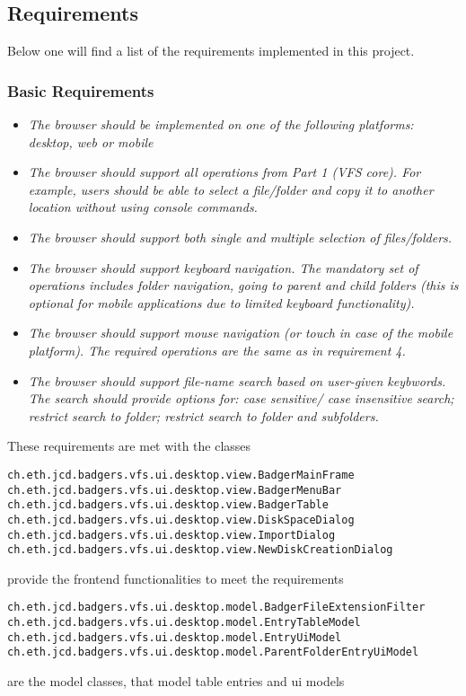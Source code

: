\subsection{Requirements}
Below one will find a list of the requirements implemented in this project.

\subsubsection {Basic Requirements}
\begin{itemize}
  \item \emph{The browser should be implemented on one of the following
  platforms: desktop, web or mobile}
  \item \emph{The browser should support all operations from Part 1 (VFS core).
  For example, users should be able to select a file/folder and copy it to
  another location without using console commands. }
  \item \emph{The browser should support both single and multiple selection of
  files/folders.}
  \item \emph{The browser should support keyboard navigation. The mandatory set of operations includes folder
  navigation, going to parent and child folders (this is optional for mobile applications due to limited
  keyboard functionality).}
  \item \emph{The browser should support mouse navigation (or touch in case of the mobile platform). The
  required operations are the same as in requirement 4.}
  \item \emph{The browser should support file-name search based on user-given
  keybwords. The search should provide options for: case sensitive/ case
  insensitive search; restrict search to folder; restrict search to folder and subfolders.}
\end{itemize}  These requirements are met with the classes
\begin{verbatim}
ch.eth.jcd.badgers.vfs.ui.desktop.view.BadgerMainFrame
ch.eth.jcd.badgers.vfs.ui.desktop.view.BadgerMenuBar
ch.eth.jcd.badgers.vfs.ui.desktop.view.BadgerTable
ch.eth.jcd.badgers.vfs.ui.desktop.view.DiskSpaceDialog
ch.eth.jcd.badgers.vfs.ui.desktop.view.ImportDialog
ch.eth.jcd.badgers.vfs.ui.desktop.view.NewDiskCreationDialog
\end{verbatim} provide the frontend functionalities to meet the requirements

\begin{verbatim}
ch.eth.jcd.badgers.vfs.ui.desktop.model.BadgerFileExtensionFilter
ch.eth.jcd.badgers.vfs.ui.desktop.model.EntryTableModel
ch.eth.jcd.badgers.vfs.ui.desktop.model.EntryUiModel
ch.eth.jcd.badgers.vfs.ui.desktop.model.ParentFolderEntryUiModel
\end{verbatim} are the model classes, that model table entries and ui models

